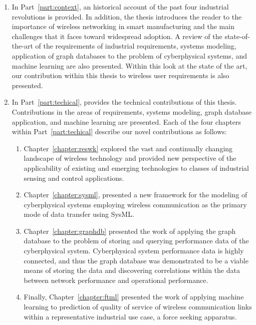 \begin{enumerate}
	\item In Part~\ref{part:context}, an historical account of the past four industrial revolutions is provided.  In addition, the thesis introduces the reader to the importance of wireless networking in smart manufacturing and the main challenges that it faces toward widespread adoption. A review of the state-of-the-art of the requirements of industrial requirements, systems modeling, application of graph databases to the problem of cyberphysical systems, and machine learning are also presented.  Within this look at the state of the art, our contribution within this thesis to wireless user requirements is also presented.
	
	\item In Part~\ref{part:techical}, provides the technical contributions of this thesis. Contributions in the areas of requirements, systems modeling, graph database application, and machine learning are presented.  Each of the four chapters within Part~\ref{part:techical} describe our novel contributions as follows:
	\begin{enumerate}
		
		\item Chapter~\ref{chapter:reswk} explored the vast and continually changing landscape of wireless technology and provided new perspective of the applicability of existing and emerging technologies to classes of industrial sensing and control applications.
		
		\item Chapter~\ref{chapter:sysml}, presented a new framework for the modeling of cyberphysical systems employing wireless communication as the primary mode of data transfer using SysML.
		
		\item Chapter~\ref{chapter:graphdb} presented the work of applying the graph database to the problem of storing and querying performance data of the cyberphysical system.  Cyberphysical system performance data is highly connected, and thus the graph database was demonstrated to be a viable means of storing the data and discovering correlations within the data between network performance and operational performance.
		
		\item Finally, Chapter~\ref{chapter:ftml} presented the work of applying machine learning to prediction of quality of service of wireless communication links within a representative industrial use case, a force seeking apparatus.
	\end{enumerate}
\end{enumerate}




